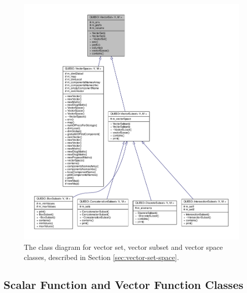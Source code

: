 \begin{figure}[htpb]
\hspace{-1cm}
\includegraphics[scale=0.65,clip=true]{rawfigs/vector_set}
\vspace*{-1.5cm}
\caption{The class diagram for vector set, vector subset and vector space classes, described in Section \ref{sec:vector-set-space}.}
\label{fig-vector-space-subset-classes}
\end{figure}

% 



\subsection{Scalar Function and Vector Function Classes}\label{sec:scalar-vector-function}

